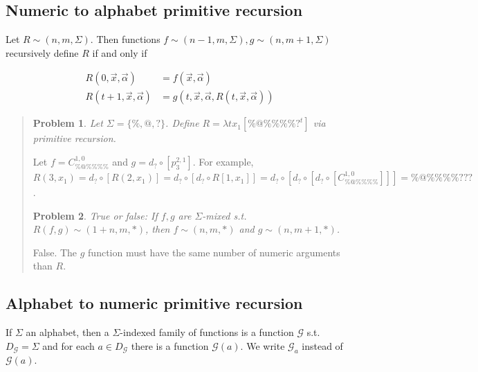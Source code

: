 \documentclass[a4paper, 12pt]{article}
\newtheorem{problem}{Problem}
\newtheorem{problem}{Problem}
\begin{document}
\subsection{Numeric to alphabet primitive recursion}


Let $R \sim (n, m, \Sigma)$. Then functions $f \sim (n - 1, m, \Sigma),  g \sim (n,
m + 1, \Sigma)$ recursively define $R$ if and only if 

\begin{align*}
    R(0, \overrightarrow{x}, \overrightarrow{\alpha}) &= f(\overrightarrow{x},
    \overrightarrow{\alpha}) \\ 
    R(t + 1, \overrightarrow{x}, \overrightarrow{\alpha}) &= g \left(t,
    \overrightarrow{x}, \overrightarrow{\alpha}, R(t, \overrightarrow{x},
\overrightarrow{\alpha})  \right) 
\end{align*}


\small
\begin{quote}

\begin{problem}
    Let $\Sigma = \{\%, @, ?\}$. Define $R = \lambda t x_1 [\% @ \% \% \% \%
    ?^{t}]$ via primitive recursion.
\end{problem}

Let $f = C_{\% @ \% \% \% \%}^{1, 0}$ and $g = d_{?}  \circ \left[ p_{3}^{2, 1}
\right] $. For example, $R(3, x_1) = 
d_? \circ \left[ R(2, x_1)
\right] = d_? \circ  \left[ d_? \circ R[1, x_1] \right] = d_? \circ \left[ d_?
\circ \left[ d_? \circ \left[ C_{\% @ \% \% \% \%}^{1, 0}  \right]  \right]
\right] = \% @ \% \% \% \% ? ? ? $.

\begin{problem}
    True or false: If $f, g$ are $\Sigma$-mixed s.t. $R(f, g) \sim (1 + n, m,
    *)$, then $f \sim (n, m, *)$ and $g \sim (n, m+1, *)$.
\end{problem}

False. The $g$ function must have the same number of numeric arguments than $R$.

\end{quote}
\normalsize


\subsection{Alphabet to numeric primitive recursion}

If $\Sigma$ an alphabet, then a $\Sigma$-indexed family of functions is a
function $\mathcal{G}$ s.t. $D_{\mathcal{G}} = \Sigma$ and for each $a \in
D_{\mathcal{G}}$ there is a function $\mathcal{G}(a)$. We write $\mathcal{G}_a$
instead of $\mathcal{G}(a)$.
\end{document}
